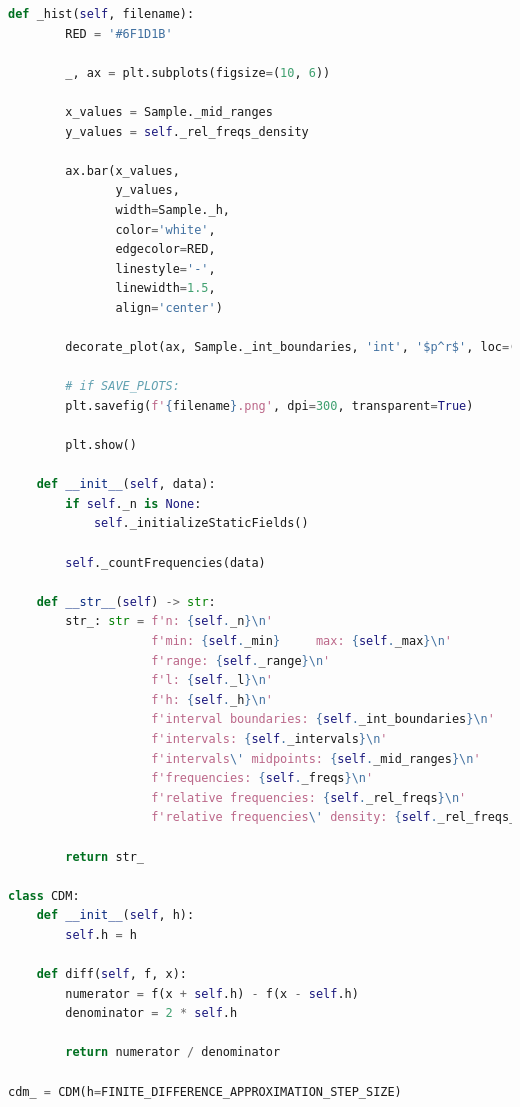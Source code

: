 \documentclass[a4paper, 14pt]{extarticle}
\begin{document}
\begin{center}
\begin{lstlisting}[language=Python]
    def _hist(self, filename):
        RED = '#6F1D1B'

        _, ax = plt.subplots(figsize=(10, 6))

        x_values = Sample._mid_ranges
        y_values = self._rel_freqs_density

        ax.bar(x_values, 
               y_values, 
               width=Sample._h, 
               color='white',
               edgecolor=RED, 
               linestyle='-', 
               linewidth=1.5, 
               align='center')

        decorate_plot(ax, Sample._int_boundaries, 'int', '$p^r$', loc=(0, 0))

        # if SAVE_PLOTS:
        plt.savefig(f'{filename}.png', dpi=300, transparent=True)

        plt.show()

    def __init__(self, data):
        if self._n is None:
            self._initializeStaticFields()

        self._countFrequencies(data)

    def __str__(self) -> str:
        str_: str = f'n: {self._n}\n'                                              \
                    f'min: {self._min}     max: {self._max}\n'                     \
                    f'range: {self._range}\n'                                      \
                    f'l: {self._l}\n'                                              \
                    f'h: {self._h}\n'                                              \
                    f'interval boundaries: {self._int_boundaries}\n'               \
                    f'intervals: {self._intervals}\n'                              \
                    f'intervals\' midpoints: {self._mid_ranges}\n'                 \
                    f'frequencies: {self._freqs}\n'                                \
                    f'relative frequencies: {self._rel_freqs}\n'                   \
                    f'relative frequencies\' density: {self._rel_freqs_density}\n' \
                    
        return str_

class CDM:
    def __init__(self, h):
        self.h = h
    
    def diff(self, f, x):
        numerator = f(x + self.h) - f(x - self.h)
        denominator = 2 * self.h

        return numerator / denominator
  
cdm_ = CDM(h=FINITE_DIFFERENCE_APPROXIMATION_STEP_SIZE)


\end{lstlisting}
\end{center}
\end{document}
